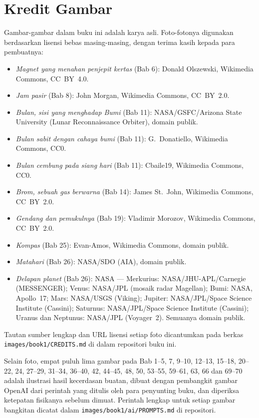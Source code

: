 \chapter*{Kredit Gambar}

Gambar-gambar dalam buku ini adalah karya asli. Foto-fotonya digunakan
berdasarkan lisensi bebas masing-masing, dengan terima kasih kepada para
pembuatnya:

\begin{itemize}
  \item \emph{Magnet yang menahan penjepit kertas} (Bab 6): Donald
        Olszewski, Wikimedia Commons, CC~BY~4.0.
  \item \emph{Jam pasir} (Bab 8): John Morgan, Wikimedia
        Commons, CC~BY~2.0.
  \item \emph{Bulan, sisi yang menghadap Bumi} (Bab 11): NASA/GSFC/Arizona
        State University (Lunar Reconnaissance Orbiter), domain
        publik.
  \item \emph{Bulan sabit dengan cahaya bumi} (Bab 11):
        G.~Donatiello, Wikimedia Commons, CC0.
  \item \emph{Bulan cembung pada siang hari} (Bab 11): Cbaile19,
        Wikimedia Commons, CC0.
  \item \emph{Brom, sebuah gas berwarna} (Bab 14): James
        St.~John, Wikimedia Commons, CC~BY~2.0.
  \item \emph{Gendang dan pemukulnya} (Bab 19): Vladimir Morozov,
        Wikimedia Commons, CC~BY~2.0.
  \item \emph{Kompas} (Bab 25): Evan-Amos, Wikimedia Commons,
        domain publik.
  \item \emph{Matahari} (Bab 26): NASA/SDO (AIA), domain
        publik.
  \item \emph{Delapan planet} (Bab 26): NASA ---
        Merkurius: NASA/JHU-APL/Carnegie (MESSENGER); Venus:
        NASA/JPL (mosaik radar Magellan); Bumi: NASA, Apollo~17;
        Mars: NASA/USGS (Viking); Jupiter: NASA/JPL/Space Science
        Institute (Cassini); Saturnus: NASA/JPL/Space Science
        Institute (Cassini); Uranus dan Neptunus: NASA/JPL
        (Voyager~2). Semuanya domain publik.
\end{itemize}

Tautan sumber lengkap dan URL lisensi setiap foto dicantumkan pada
berkas \texttt{images/\allowbreak book1/\allowbreak CREDITS.md} di dalam
repositori buku ini.

\bigskip
Selain foto, empat puluh lima gambar pada Bab 1--5, 7,
9--10, 12--13, 15--18, 20--22, 24, 27--29, 31--34, 36--40, 42,
44--45, 48, 50, 53--55, 59--61, 63, 66 dan 69--70 adalah
ilustrasi hasil kecerdasan buatan, dibuat dengan pembangkit gambar
OpenAI dari perintah yang ditulis oleh para penyunting buku, dan
diperiksa ketepatan fisikanya sebelum dimuat. Perintah lengkap untuk
setiap gambar bangkitan dicatat dalam
\texttt{images/\allowbreak book1/\allowbreak ai/\allowbreak PROMPTS.md} di repositori.
\clearpage
